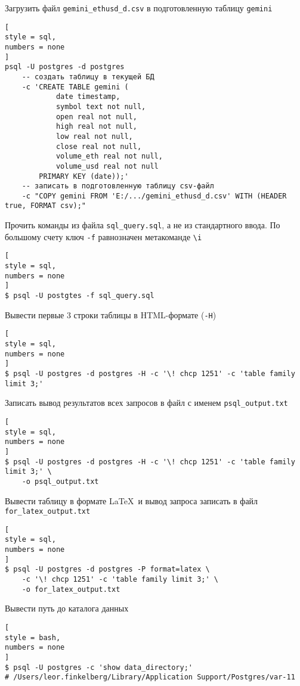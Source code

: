 \documentclass[%
	11pt,
	a4paper,
	utf8,
		]{article}
\begin{document}
Загрузить файл \texttt{gemini\_ethusd\_d.csv} в подготовленную таблицу \texttt{gemini}
\begin{lstlisting}[
style = sql,
numbers = none
]
psql -U postgres -d postgres
    -- создать таблицу в текущей БД
    -c 'CREATE TABLE gemini ( 
            date timestamp,
            symbol text not null,
            open real not null,
            high real not null,
            low real not null,
            close real not null,
            volume_eth real not null,
            volume_usd real not null
        PRIMARY KEY (date));'
    -- записать в подготовленную таблицу csv-файл
    -c "COPY gemini FROM 'E:/.../gemini_ethusd_d.csv' WITH (HEADER true, FORMAT csv);"
\end{lstlisting}



Прочить команды из файла \texttt{sql\_query.sql}, а не из стандартного ввода. По большому счету ключ \texttt{-f} равнозначен метакоманде \verb|\i|
\begin{lstlisting}[
style = sql,
numbers = none
]
$ psql -U postgtes -f sql_query.sql
\end{lstlisting}

Вывести первые 3 строки таблицы в HTML-формате (\texttt{-H})
\begin{lstlisting}[
style = sql,
numbers = none
]
$ psql -U postgres -d postgres -H -c '\! chcp 1251' -c 'table family limit 3;'
\end{lstlisting}

Записать вывод результатов всех запросов в файл с именем \texttt{psql\_output.txt}
\begin{lstlisting}[
style = sql,
numbers = none
]
$ psql -U postgres -d postgres -H -c '\! chcp 1251' -c 'table family limit 3;' \
    -o psql_output.txt
\end{lstlisting}

Вывести таблицу в формате \LaTeX\ и вывод запроса записать в файл \texttt{for\_latex\_output.txt}
\begin{lstlisting}[
style = sql,
numbers = none
]
$ psql -U postgres -d postgres -P format=latex \
    -c '\! chcp 1251' -c 'table family limit 3;' \
    -o for_latex_output.txt
\end{lstlisting}

Вывести путь до каталога данных
\begin{lstlisting}[
style = bash,
numbers = none	
]
$ psql -U postgres -c 'show data_directory;'
# /Users/leor.finkelberg/Library/Application Support/Postgres/var-11 
\end{lstlisting}
\end{document}
